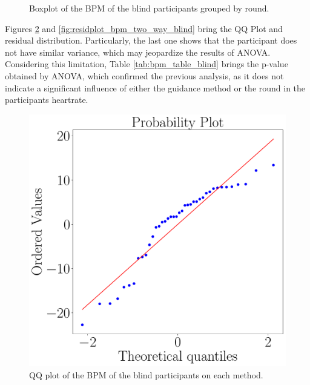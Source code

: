 \begin{figure}[!htb]
\begin{minipage}{0.45\textwidth}
        \caption{Boxplot of the BPM of the blind participants grouped by round.}
        \label{fig:boxplot_ecg_bpm_blind_rounds}
    \end{minipage}
\end{figure}

Figures \ref{fig:qqplot_bpm_two_way_blind} and \ref{fig:residplot_bpm_two_way_blind} bring the QQ Plot and residual distribution. Particularly, the last one shows that the participant does not have similar variance, which may jeopardize the results of ANOVA. Considering this limitation, Table \ref{tab:bpm_table_blind} brings the p-value obtained by ANOVA, which confirmed the previous analysis, as it does not indicate a significant influence of either the guidance method or the round in the participants heartrate. 

\begin{figure}[!htb]
    \centering
    \begin{minipage}{0.45\textwidth}
        \centering
        \includegraphics[width = 0.8\linewidth]{Resultados/ECG/Figuras/pdf/qqplot_bpm_two_way_blind.pdf}
        \caption{QQ plot of the BPM of the blind participants on each method.}
        \label{fig:qqplot_bpm_two_way_blind}
    \end{minipage}
    \begin{minipage}{0.075\textwidth}
        \hfill
    \end{minipage}
    \begin{minipage}{0.45\textwidth}
        \centering

\end{minipage}
\end{figure}
